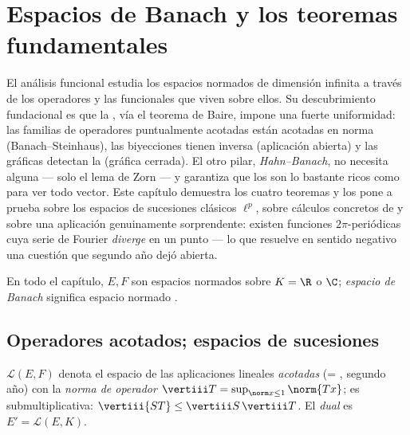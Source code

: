 \chapter{Espacios de Banach y los teoremas fundamentales}
\label{ch:b3:banach}

El análisis funcional estudia los espacios normados de dimensión
infinita a través de los operadores y las funcionales que viven sobre
ellos. Su descubrimiento fundacional es que la
\emph{}, vía el teorema de
Baire, impone una fuerte uniformidad: las familias de operadores
puntualmente acotadas están acotadas en norma (Banach--Steinhaus), las
biyecciones  tienen
inversa  (aplicación
abierta) y las gráficas detectan la
 (gráfica cerrada). El
otro pilar, \emph{Hahn--Banach}, no necesita
 alguna --- solo el lema
de Zorn --- y garantiza que los  son lo bastante ricos como para ver todo vector. Este capítulo
demuestra los cuatro teoremas y los pone a prueba sobre los espacios de
sucesiones clásicos $\ell^p$, sobre cálculos concretos de
 y sobre una aplicación
genuinamente sorprendente: existen funciones
 $2\pi$-periódicas cuya
serie de Fourier \emph{diverge} en un punto --- lo que resuelve en
sentido negativo una cuestión que segundo año dejó abierta.

En todo el capítulo, $E, F$ son espacios normados sobre $K = \R$ o $\C$;
\emph{espacio de Banach} significa espacio
normado .

\section{Operadores acotados; espacios de sucesiones}

\begin{definition}\label{def:b3:banach:operator}
$\mathcal L(E, F)$ denota el espacio de las aplicaciones lineales
\emph{acotadas} (= ,
segundo año) con la \emph{norma de operador}
$\vertiii T = \sup_{\norm x \leq
1}\norm{Tx}$; es submultiplicativa: $\vertiii{ST} \leq
\vertiii S\,\vertiii T$. El \emph{dual} es
$E' = \mathcal L(E, K)$.
\end{definition}

